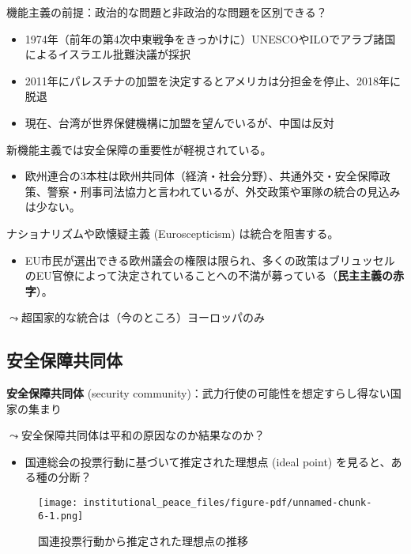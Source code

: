 \documentclass[
  xelatex,
  ja=standard]{bxjsarticle}
\providecommand{\tightlist}{%
  \setlength{\itemsep}{0pt}\setlength{\parskip}{0pt}}\usepackage{longtable,booktabs,array}
\begin{document}
機能主義の前提：政治的な問題と非政治的な問題を区別できる？

\begin{itemize}
\tightlist
\item
  1974年（前年の第4次中東戦争をきっかけに）UNESCOやILOでアラブ諸国によるイスラエル批難決議が採択
\item
  2011年にパレスチナの加盟を決定するとアメリカは分担金を停止、2018年に脱退
\item
  現在、台湾が世界保健機構に加盟を望んでいるが、中国は反対
\end{itemize}

新機能主義では安全保障の重要性が軽視されている。

\begin{itemize}
\tightlist
\item
  欧州連合の3本柱は欧州共同体（経済・社会分野）、共通外交・安全保障政策、警察・刑事司法協力と言われているが、外交政策や軍隊の統合の見込みは少ない。
\end{itemize}

ナショナリズムや欧懐疑主義 (Euroscepticism) は統合を阻害する。

\begin{itemize}
\tightlist
\item
  EU市民が選出できる欧州議会の権限は限られ、多くの政策はブリュッセルのEU官僚によって決定されていることへの不満が募っている（\textbf{民主主義の赤字}）。
\end{itemize}

\(\leadsto\)超国家的な統合は（今のところ）ヨーロッパのみ

\hypertarget{ux5b89ux5168ux4fddux969cux5171ux540cux4f53}{%
\subsection{安全保障共同体}\label{ux5b89ux5168ux4fddux969cux5171ux540cux4f53}}

\textbf{安全保障共同体} (security
community)：武力行使の可能性を想定すらし得ない国家の集まり\citep{deutsch2015}

\(\leadsto\)安全保障共同体は平和の原因なのか結果なのか？

\begin{itemize}
\tightlist
\item
  国連総会の投票行動に基づいて推定された理想点 (ideal point)
  \citep{bailey2017}を見ると、ある種の分断？
\end{itemize}

\begin{figure}[htpb]

{\centering \texttt{[image: institutional\_peace\_files/figure-pdf/unnamed-chunk-6-1.png]}

}

\caption{国連投票行動から推定された理想点の推移}

\end{figure}
\end{document}
